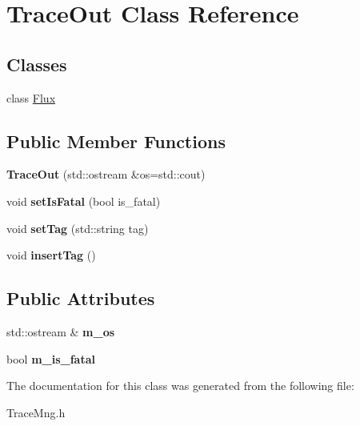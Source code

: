 \hypertarget{classTraceOut}{
\section{TraceOut Class Reference}
\label{classTraceOut}
}
\subsection*{Classes}
\begin{DoxyCompactItemize}
\item 
class \hyperlink{classTraceOut_1_1Flux}{Flux}
\end{DoxyCompactItemize}
\subsection*{Public Member Functions}
\begin{DoxyCompactItemize}
\item 
\hypertarget{classTraceOut_a6fc2da1f125f092d961ec4144ea158af}{
{\bfseries TraceOut} (std::ostream \&os=std::cout)}
\label{classTraceOut_a6fc2da1f125f092d961ec4144ea158af}

\item 
\hypertarget{classTraceOut_aa6249f0fc83fa27c5b7becb8018ba6d3}{
void {\bfseries setIsFatal} (bool is\_\-fatal)}
\label{classTraceOut_aa6249f0fc83fa27c5b7becb8018ba6d3}

\item 
\hypertarget{classTraceOut_a3ca1a57d2cb8dacc4d0ba720063d47cd}{
void {\bfseries setTag} (std::string tag)}
\label{classTraceOut_a3ca1a57d2cb8dacc4d0ba720063d47cd}

\item 
\hypertarget{classTraceOut_a91e06f67c42be20d6951bb1e5df97516}{
void {\bfseries insertTag} ()}
\label{classTraceOut_a91e06f67c42be20d6951bb1e5df97516}

\end{DoxyCompactItemize}
\subsection*{Public Attributes}
\begin{DoxyCompactItemize}
\item 
\hypertarget{classTraceOut_adcb025b62f5f29506eddf2499b3cbee3}{
std::ostream \& {\bfseries m\_\-os}}
\label{classTraceOut_adcb025b62f5f29506eddf2499b3cbee3}

\item 
\hypertarget{classTraceOut_a554933716accee192ba86bd9241467f8}{
bool {\bfseries m\_\-is\_\-fatal}}
\label{classTraceOut_a554933716accee192ba86bd9241467f8}

\end{DoxyCompactItemize}


The documentation for this class was generated from the following file:\begin{DoxyCompactItemize}
\item 
TraceMng.h\end{DoxyCompactItemize}
